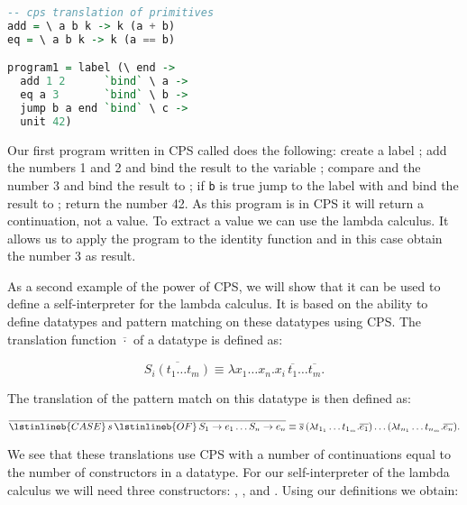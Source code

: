 \begin{lstlisting}[language=Haskell]
-- cps translation of primitives
add = \ a b k -> k (a + b)
eq = \ a b k -> k (a == b)

program1 = label (\ end ->
  add 1 2      `bind` \ a ->
  eq a 3       `bind` \ b ->
  jump b a end `bind` \ c ->
  unit 42)
\end{lstlisting}

Our first program written in \ac{CPS} called  does the following: create a label ; add the numbers 1 and 2 and bind the result to the variable ; compare  and the number 3 and bind the result to ; if \lstinline{b} is true jump to the label  with  and bind the result to ; return the number 42. As this program is in \ac{CPS} it will return a continuation, not a value. To extract a value we can use the lambda calculus. It allows us to apply the program to the identity function and in this case obtain the number 3 as result.


As a second example of the power of \ac{CPS}, we will show that it can be used to define a self-interpreter for the lambda calculus\autocite{DBLP:journals/jfp/Mogensen92}. It is based on the ability to define datatypes and pattern matching on these datatypes using \ac{CPS}. The translation function $\overline{\cdot}$ of a datatype is defined as:

\begin{equation*}
\overline{S_i (t_1 \dots t_m)} \equiv \lambda x_1 \dots x_n . x_i \, \overline{t_1} \dots \overline{t_m}.
\end{equation*}

The translation of the pattern match on this datatype is then defined as:

\begin{equation*}
\overline{\lstinlineb{CASE} \, s \, \lstinlineb{OF} \, S_1 \to e_1 \dots S_n \to e_n} \equiv \overline{s} \, (\lambda t_{1_1} \dots t_{1_m} . \overline{e_1}) \dots (\lambda t_{n_1} \dots t_{n_m} . \overline{e_n}).
\end{equation*}

We see that these translations use \ac{CPS} with a number of continuations equal to the number of constructors in a datatype. For our self-interpreter of the lambda calculus we will need three constructors: , , and . Using our definitions we obtain:


